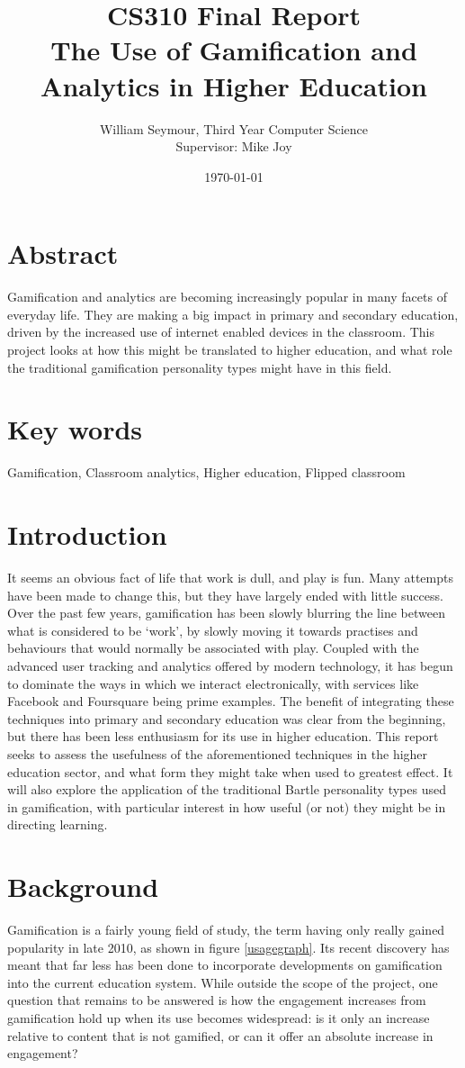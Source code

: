 \documentclass{article}
\title{CS310 Final Report \\ The Use of Gamification and Analytics in Higher Education}
\author{William Seymour, Third Year Computer Science \\ Supervisor: Mike Joy}
\date{\today}
\begin{document}
\maketitle
\clearpage
\tableofcontents

\section{Abstract}
Gamification and analytics are becoming increasingly popular in many facets of everyday life. They are making a big impact in primary and secondary education, driven by the increased use of internet enabled devices in the classroom. This project looks at how this might be translated to higher education, and what role the traditional gamification personality types might have in this field.

\section{Key words}
Gamification, Classroom analytics, Higher education, Flipped classroom

\section{Introduction}
It seems an obvious fact of life that work is dull, and play is fun. Many attempts have been made to change this, but they have largely ended with little success. Over the past few years, gamification has been slowly blurring the line between what is considered to be `work', by slowly moving it towards practises and behaviours that would normally be associated with play. Coupled with the advanced user tracking and analytics offered by modern technology, it has begun to dominate the ways in which we interact electronically, with services like Facebook and Foursquare being prime examples. The benefit of integrating these techniques into primary and secondary education was clear from the beginning, but there has been less enthusiasm for its use in higher education. This report seeks to assess the usefulness of the aforementioned techniques in the higher education sector, and what form they might take when used to greatest effect. It will also explore the application of the traditional Bartle personality types used in gamification, with particular interest in how useful (or not) they might be in directing learning.

\section{Background}
Gamification is a fairly young field of study, the term having only really gained popularity in late 2010, as shown in figure \ref{usagegraph}. Its recent discovery has meant that far less has been done to incorporate developments on gamification into the current education system. While outside the scope of the project, one question that remains to be answered is how the engagement increases from gamification hold up when its use becomes widespread: is it only an increase relative to content that is not gamified, or can it offer an absolute increase in engagement?
\end{document}
